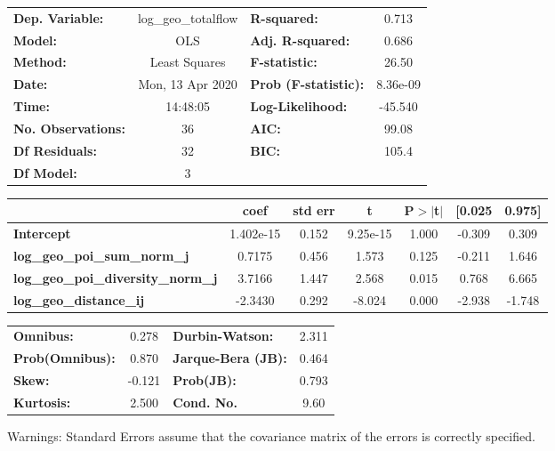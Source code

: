 \begin{center}
\begin{tabular}{lclc}
\toprule
\textbf{Dep. Variable:}                    & log\_geo\_totalflow & \textbf{  R-squared:         } &     0.713   \\
\textbf{Model:}                            &         OLS         & \textbf{  Adj. R-squared:    } &     0.686   \\
\textbf{Method:}                           &    Least Squares    & \textbf{  F-statistic:       } &     26.50   \\
\textbf{Date:}                             &   Mon, 13 Apr 2020  & \textbf{  Prob (F-statistic):} &  8.36e-09   \\
\textbf{Time:}                             &       14:48:05      & \textbf{  Log-Likelihood:    } &   -45.540   \\
\textbf{No. Observations:}                 &            36       & \textbf{  AIC:               } &     99.08   \\
\textbf{Df Residuals:}                     &            32       & \textbf{  BIC:               } &     105.4   \\
\textbf{Df Model:}                         &             3       & \textbf{                     } &             \\
\bottomrule
\end{tabular}
\begin{tabular}{lcccccc}
                                           & \textbf{coef} & \textbf{std err} & \textbf{t} & \textbf{P$> |$t$|$} & \textbf{[0.025} & \textbf{0.975]}  \\
\midrule
\textbf{Intercept}                         &    1.402e-15  &        0.152     &  9.25e-15  &         1.000        &       -0.309    &        0.309     \\
\textbf{log\_geo\_poi\_sum\_norm\_j}       &       0.7175  &        0.456     &     1.573  &         0.125        &       -0.211    &        1.646     \\
\textbf{log\_geo\_poi\_diversity\_norm\_j} &       3.7166  &        1.447     &     2.568  &         0.015        &        0.768    &        6.665     \\
\textbf{log\_geo\_distance\_ij}            &      -2.3430  &        0.292     &    -8.024  &         0.000        &       -2.938    &       -1.748     \\
\bottomrule
\end{tabular}
\begin{tabular}{lclc}
\textbf{Omnibus:}       &  0.278 & \textbf{  Durbin-Watson:     } &    2.311  \\
\textbf{Prob(Omnibus):} &  0.870 & \textbf{  Jarque-Bera (JB):  } &    0.464  \\
\textbf{Skew:}          & -0.121 & \textbf{  Prob(JB):          } &    0.793  \\
\textbf{Kurtosis:}      &  2.500 & \textbf{  Cond. No.          } &     9.60  \\
\bottomrule
\end{tabular}
\end{center}

Warnings: \newline
 [1] Standard Errors assume that the covariance matrix of the errors is correctly specified.